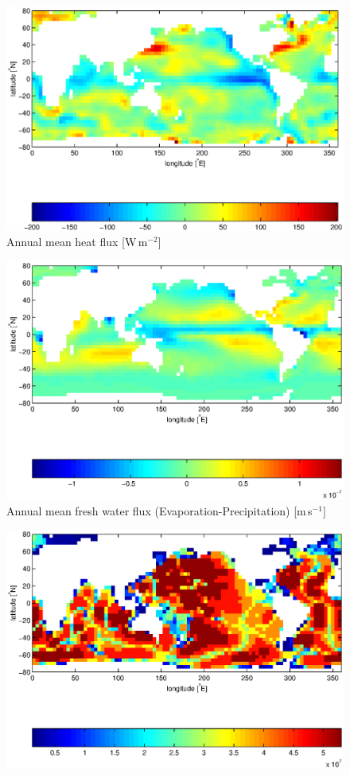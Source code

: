 {\begin{figure}[t]
  \begin{center}
    \includegraphics[width=.9\textwidth]{s_examples/global_oce_in_p/qnet}
    \caption{Annual mean heat flux [W\,m$^{-2}$]}
    \label{fig:sim_config_qnet_pcoord}
  \end{center}
\end{figure}
\begin{figure}[t]
  \begin{center}
    \includegraphics[width=.9\textwidth]{s_examples/global_oce_in_p/emp}
    \caption{Annual mean fresh water flux (Evaporation-Precipitation) [m\,s$^{-1}$]}
    \label{fig:sim_config_empmr_pcoord}
  \end{center}
\end{figure}
\begin{figure}[t]
  \begin{center}
    \includegraphics[width=.9\textwidth]{s_examples/global_oce_in_p/pb0}

\end{center}
\end{figure}}
